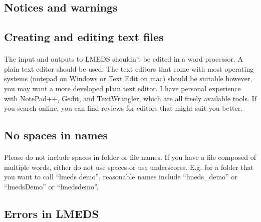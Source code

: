 \documentclass[12pt, oneside]{scrbook}   	%
\begin{document}
\begin{tcolorbox}[breakable,colback=white,colframe=red,width=\dimexpr\textwidth+12mm\relax,enlarge left by=-6mm]

\section{Notices and warnings}

\subsection{Creating and editing text files}

\paragraph{}

The input and outputs to LMEDS shouldn't be edited in a word processor.  A plain text editor should be used.  The text editors that come with most operating systems (notepad on Windows or Text Edit on mac) should be suitable however, you may want a more developed plain text editor.  I have personal experience with NotePad++, Gedit, and TextWrangler, which are all freely available tools.  If you search online, you can find reviews for editors that might suit you better.

\subsection{No spaces in names}

\paragraph{}

Please do not include spaces in folder or file names.  If you have a file composed of multiple words, either do not use spaces or use underscores.  E.g. for a folder that you want to call ``lmeds demo'', reasonable names include ``lmeds\_demo'' or ``lmedsDemo'' or ``lmedsdemo''.

\subsection{Errors in LMEDS}

\paragraph{}


\end{tcolorbox}
\end{document}
